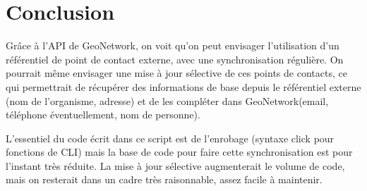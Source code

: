\documentclass[11pt, a4paper, oneside]{book}
\newcommand{\gn}{GeoNetwork\xspace}
\begin{document}
\section*{Conclusion}
Grâce à l'API de \gn, on voit qu'on peut envisager l'utilisation d'un référentiel de point de contact externe, avec une synchronisation régulière. On pourrait même envisager une mise à jour sélective de ces points de contacts, ce qui permettrait de récupérer des informations de base depuis le référentiel externe (nom de l'organisme, adresse) et de les compléter dans \gn (email, téléphone éventuellement, nom de personne).

L'essentiel du code écrit dans ce script est de l'enrobage (syntaxe click pour fonctions de CLI) mais la base de code pour faire cette synchronisation est pour l'instant très réduite. La mise à jour sélective augmenterait le volume de code, mais on resterait dans un cadre très raisonnable, assez facile à maintenir.
\end{document}
